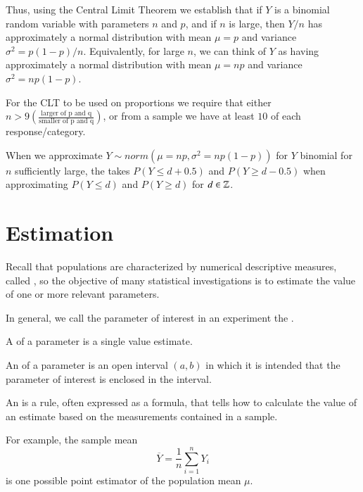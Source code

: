 \documentclass[12pt, a4paper, twoside, openright, titlepage]{book}
\begin{document}
Thus, using the Central Limit Theorem we establish that if $Y$ is a binomial random variable with parameters $n$ and $p$, and if $n$ is large, then $Y/n$ has approximately a normal distribution with mean $\mu = p$ and variance $\sigma^2 = p(1-p)/n$. Equivalently, for large $n$, we can think of $Y$ as having approximately a normal distribution with mean $\mu = np$ and variance $\sigma^2 = np(1-p)$.


For the CLT to be used on proportions we require that either $n > 9\left(\frac{\text{larger of p and q}}{\text{smaller of p and q}}\right)$, or from a sample we have at least $10$ of each response/category.

\begin{defn}{}{}
    When we approximate $Y \sim norm(\mu = np, \sigma^2 = np(1-p))$ for $Y$ binomial for $n$ sufficiently large, the  takes $P(Y \leq d+0.5)$ and $P(Y\geq d-0.5)$ when approximating $P(Y\leq d)$ and $P(Y\geq d)$ for $d \in \mathbb Z$.
\end{defn}




\chapter{Estimation}

Recall that populations are characterized by numerical descriptive measures, called , so the objective of many statistical investigations is to estimate the value of one or more relevant parameters.

In general, we call the parameter of interest in an experiment the .

\begin{defn}{}{}
    A  of a parameter is a single value estimate.
\end{defn}

\begin{defn}{}{}
    An  of a parameter is an open interval $(a,b)$ in which it is intended that the parameter of interest is enclosed in the interval.
\end{defn}


\begin{defn}{}{}
    An  is a rule, often expressed as a formula, that tells how to calculate the value of an estimate based on the measurements contained in a sample.
\end{defn}

For example, the sample mean \begin{equation*}
    \overline{Y} = \frac{1}{n}\sum\limits_{i=1}^nY_i
\end{equation*}
is one possible point estimator of the population mean $\mu$.
\end{document}
